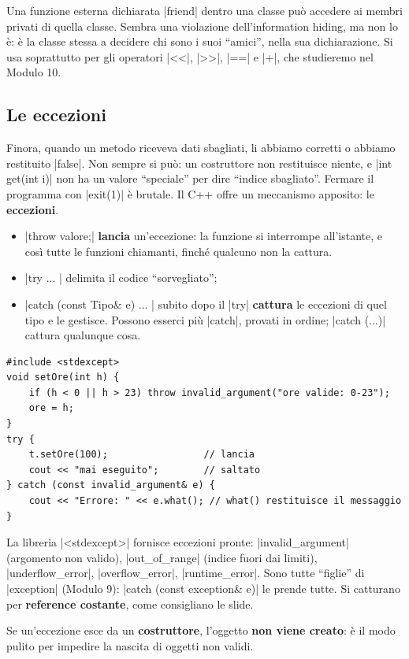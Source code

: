 Una funzione esterna dichiarata \cc|friend| dentro una classe può accedere ai
membri privati di quella classe. Sembra una violazione dell'information hiding,
ma non lo è: è la classe stessa a decidere chi sono i suoi ``amici'', nella sua
dichiarazione. Si usa soprattutto per gli operatori \cc|<<|, \cc|>>|, \cc|==| e
\cc|+|, che studieremo nel Modulo 10.

\subsection*{Le eccezioni}

Finora, quando un metodo riceveva dati sbagliati, li abbiamo corretti o abbiamo
restituito \cc|false|. Non sempre si può: un costruttore non restituisce niente, e
\cc|int get(int i)| non ha un valore ``speciale'' per dire ``indice sbagliato''.
Fermare il programma con \cc|exit(1)| è brutale. Il C++ offre un meccanismo
apposito: le \textbf{eccezioni}.

\begin{itemize}
  \item \cc|throw valore;| \textbf{lancia} un'eccezione: la funzione si interrompe
        all'istante, e così tutte le funzioni chiamanti, finché qualcuno non la cattura.
  \item \cc|try { ... }| delimita il codice ``sorvegliato'';
  \item \cc|catch (const Tipo& e) { ... }| subito dopo il \cc|try| \textbf{cattura}
        le eccezioni di quel tipo e le gestisce. Possono esserci più \cc|catch|,
        provati in ordine; \cc|catch (...)| cattura qualunque cosa.
\end{itemize}
\begin{lstlisting}
#include <stdexcept>
void setOre(int h) {
    if (h < 0 || h > 23) throw invalid_argument("ore valide: 0-23");
    ore = h;
}
try {
    t.setOre(100);                 // lancia
    cout << "mai eseguito";        // saltato
} catch (const invalid_argument& e) {
    cout << "Errore: " << e.what(); // what() restituisce il messaggio
}
\end{lstlisting}
La libreria \cc|<stdexcept>| fornisce eccezioni pronte: \cc|invalid_argument|
(argomento non valido), \cc|out_of_range| (indice fuori dai limiti),
\cc|underflow_error|, \cc|overflow_error|, \cc|runtime_error|. Sono tutte
``figlie'' di \cc|exception| (Modulo 9): \cc|catch (const exception& e)| le prende
tutte. Si catturano per \textbf{reference costante}, come consigliano le slide.

Se un'eccezione esce da un \textbf{costruttore}, l'oggetto \textbf{non viene
creato}: è il modo pulito per impedire la nascita di oggetti non validi.

